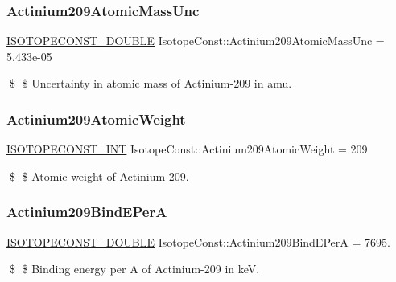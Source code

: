 \subsubsection{\texorpdfstring{Actinium209\+Atomic\+Mass\+Unc}{Actinium209AtomicMassUnc}}
{\footnotesize\ttfamily \mbox{\hyperlink{group___isotope_const-_macros_ga8f45a7272ce02c0b4c65c44636ed719a}{I\+S\+O\+T\+O\+P\+E\+C\+O\+N\+S\+T\+\_\+\+D\+O\+U\+B\+LE}} Isotope\+Const\+::\+Actinium209\+Atomic\+Mass\+Unc = 5.\+433e-\/05}

\$ \$ Uncertainty in atomic mass of Actinium-\/209 in amu. \mbox{\label{group___isotope_const-_actinium-_ac209_ga344bf54eb6c8e582bc6d52e0c2c18f81}} 
\subsubsection{\texorpdfstring{Actinium209\+Atomic\+Weight}{Actinium209AtomicWeight}}
{\footnotesize\ttfamily \mbox{\hyperlink{group___isotope_const-_macros_ga5f18360b3e99483a35c32d789e62621c}{I\+S\+O\+T\+O\+P\+E\+C\+O\+N\+S\+T\+\_\+\+I\+NT}} Isotope\+Const\+::\+Actinium209\+Atomic\+Weight = 209}

\$ \$ Atomic weight of Actinium-\/209. \mbox{\label{group___isotope_const-_actinium-_ac209_ga1296ef385f2809251db0ca9b488c29e8}} 
\subsubsection{\texorpdfstring{Actinium209\+Bind\+E\+PerA}{Actinium209BindEPerA}}
{\footnotesize\ttfamily \mbox{\hyperlink{group___isotope_const-_macros_ga8f45a7272ce02c0b4c65c44636ed719a}{I\+S\+O\+T\+O\+P\+E\+C\+O\+N\+S\+T\+\_\+\+D\+O\+U\+B\+LE}} Isotope\+Const\+::\+Actinium209\+Bind\+E\+PerA = 7695.}

\$ \$ Binding energy per A of Actinium-\/209 in keV. \mbox{\label{group___isotope_const-_actinium-_ac209_ga866e6023e0ca45c304a60635c2a6dafc}} 
